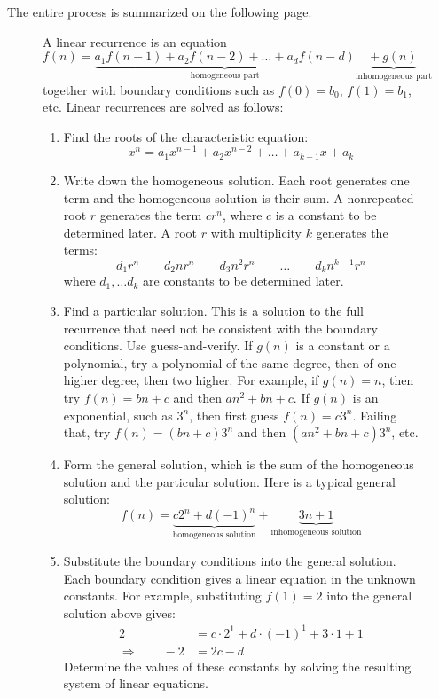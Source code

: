 The entire process is summarized on the following page.

\begin{figure}[p]

\begin{aside}[to \textheight]

A linear recurrence is an equation
\begin{equation*}
f(n) = \underbrace{a_1 f(n-1) + a_2 f(n-2) + \ldots + a_d f(n -
  d)}_{\text{homogeneous part}}
\underbrace{+\ g(n)}_{\text{inhomogeneous part}}
\end{equation*}
together with boundary conditions such as $f(0) = b_0$, $f(1) = b_1$,
etc.  Linear recurrences are solved as follows:

\begin{enumerate}
\item Find the roots of the characteristic equation:
\begin{equation*}
x^n = a_1 x^{n-1} + a_2 x^{n-2} + \ldots + a_{k-1} x + a_k
\end{equation*}
\item Write down the homogeneous solution.  Each root generates one
  term and the homogeneous solution is their sum.  A nonrepeated root
  $r$ generates the term $c r^n$, where $c$ is a constant to be
  determined later.  A root $r$ with multiplicity $k$ generates the
  terms:
\[
d_{1} r^n \qquad d_2 n r^n \qquad d_3 n^2 r^n \qquad \ldots \qquad d_k n^{k-1} r^n
\]
where $d_1, \ldots d_k$ are constants to be determined later.
\item Find a particular solution.  This is a solution to the full
  recurrence that need not be consistent with the boundary conditions.
  Use guess-and-verify.  If $g(n)$ is a constant or a polynomial, try
  a polynomial of the same degree, then of one higher degree, then two
  higher.  For example, if $g(n) = n$, then try $f(n) = bn + c$ and
  then $an^2 + bn + c$.  If $g(n)$ is an exponential, such as $3^n$,
  then first guess $f(n) = c3^n$.  Failing that, try $f(n) = (bn + c) 3^n$
  and then $(an^2 + bn + c)3^n$, etc.
\item Form the general solution, which is the sum of the homogeneous
  solution and the particular solution.  Here is a typical general
  solution:
\begin{equation*}
f(n) = \underbrace{c2^n + d(-1)^n}_{\text{homogeneous solution}} +
\underbrace{3n + 1}_{\text{inhomogeneous solution}}
\end{equation*}
\item Substitute the boundary conditions into the general solution.
  Each boundary condition gives a linear equation in the unknown
  constants.  For example, substituting $f(1) = 2$ into the general
  solution above gives:
\begin{align*}
2 & = c\cdot2^1 + d \cdot(-1)^1 + 3 \cdot 1 + 1 \\
\Rightarrow \qquad -2 & = 2c - d
\end{align*}
Determine the values of these constants by solving the resulting
system of linear equations.
\end{enumerate}
\end{aside}


\end{figure}
